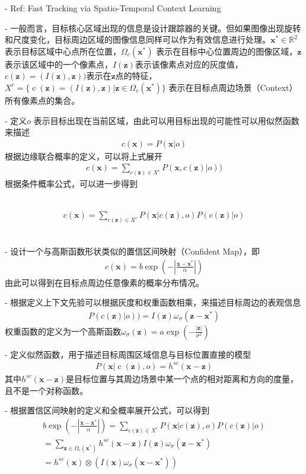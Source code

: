 - Ref: Fast Tracking via Spatio-Temporal Context Learning


- 一般而言，目标核心区域出现的信息是设计跟踪器的关键。但如果图像出现旋转和尺度变化，目标周边区域的图像信息同样可以作为有效信息进行处理。$\mathbf{x}^{*}\in \mathbb{R}^2$表示目标区域中心点所在位置，${{\Omega }_{c}}({{\mathbf{x}}^{*}})$ 表示在目标中心位置周边的图像区域，$\mathbf{z}$表示该区域中的一个像素点，$I(\mathbf{z})$表示该像素点对应的灰度值，$c(\mathbf{z})=(I(\mathbf{z}), \mathbf{z}))$表示在$\mathbf{z}$点的特征，${{X}^{c}}=\{\operatorname{c}(\mathbf{z})=(I(\mathbf{z}),\mathbf{z})|\mathbf{z}\in {{\Omega }_{c}}({{\mathbf{x}}^{*}})\}$ 表示在目标点周边场景（Context）所有像素点的集合。

- 定义$o$ 表示目标出现在当前区域，由此可以用目标出现的可能性可以用似然函数来描述
\begin{align}
c(\mathbf{x})=P(\mathbf{x}|o)
\end{align}
根据边缘联合概率的定义，可以将上式展开
\begin{align}
c(\mathbf{x})=\sum_{c(\mathbf{z})\in X^c}P(\mathbf{x}, c(\mathbf{z})|o))
\end{align}
根据条件概率公式，可以进一步得到

​
\begin{align}
c(\mathbf{x})=\sum_{c(\mathbf{z})\in X^c}P(\mathbf{x}|c(\mathbf{z}),o)P(c(\mathbf{z})|o)
\end{align}
​

- 设计一个与高斯函数形状类似的置信区间映射（Confident Map），即
\begin{align}
c(\mathbf{x})=b\exp(-|\frac{\mathbf{x}-\mathbf{x}^{*}}{\alpha}|)
\end{align}
由此可以得到在目标点周边任意像素的概率分布情况。

- 根据定义上下文先验可以根据灰度和权重函数相乘，来描述目标周边的表观信息
\begin{align}
P(c(\mathbf{z})|o))=I(\mathbf{z})\omega_\sigma(\mathbf{z}-\mathbf{x}^*)
\end{align}
权重函数的定义为一个高斯函数$\omega_{\sigma}(\mathbf{z})=a\exp(-\frac{|\mathbf{z}|}{\sigma^2})$

- 定义似然函数，用于描述目标周围区域信息与目标位置直接的模型
\begin{align}
P(\mathbf{x}|\operatorname{c}(\mathbf{z}),o)={{h}^{sc}}(\mathbf{x}-\mathbf{z})
\end{align}
其中${{h}^{sc}}(\mathbf{x}-\mathbf{z})$是目标位置与其周边场景中某一个点的相对距离和方向的度量，且不是一个对称函数。

- 根据置信区间映射的定义和全概率展开公式，可以得到
\begin{align}
b\exp(-|\frac{\mathbf{x}-\mathbf{x}^{*}}{\alpha}|)=\sum_{c(\mathbf{z})\in X^c}P(\mathbf{x}|c(\mathbf{z}),o)P(c(\mathbf{z})|o)\\
=\sum_{\mathbf{z}\in\Omega_c(\mathbf{x}^*)}{{h}^{sc}}(\mathbf{x}-\mathbf{z})I(\mathbf{z})\omega_\sigma(\mathbf{z}-\mathbf{x}^*)\\
=h^{sc}(\mathbf{x})\otimes (I(\mathbf{x})\omega_\sigma(\mathbf{x}-\mathbf{x}^*))
\end{align}

